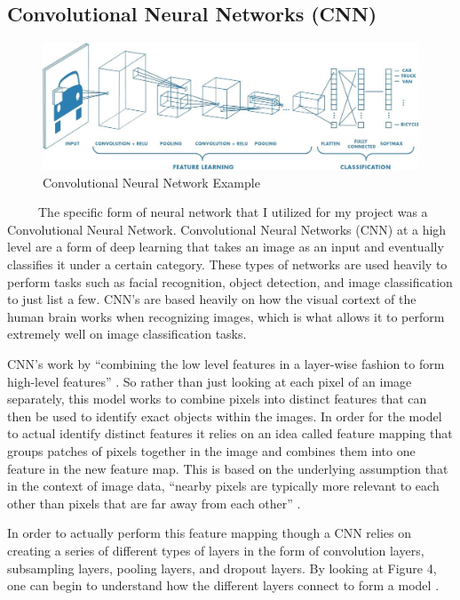 \documentclass[12pt]{article}
\begin{document}
\hypertarget{convolutional-neural-networks-cnn}{%
\subsection{Convolutional Neural Networks
(CNN)}\label{convolutional-neural-networks-cnn}}

\begin{figure}

{\centering \includegraphics[width=0.75\linewidth,height=0.25\textheight]{images/cnn} 

}

\caption{Convolutional Neural Network Example}\label{fig:sample-fig4}
\end{figure}

~~~~~The specific form of neural network that I utilized for my project
was a Convolutional Neural Network. Convolutional Neural Networks (CNN)
at a high level are a form of deep learning that takes an image as an
input and eventually classifies it under a certain category. These types
of networks are used heavily to perform tasks such as facial
recognition, object detection, and image classification to just list a
few. CNN's are based heavily on how the visual cortext of the human
brain works when recognizing images, which is what allows it to perform
extremely well on image classification tasks.

CNN's work by ``combining the low level features in a layer-wise fashion
to form high-level features'' \citep{PML}. So rather than just looking
at each pixel of an image separately, this model works to combine pixels
into distinct features that can then be used to identify exact objects
within the images. In order for the model to actual identify distinct
features it relies on an idea called feature mapping that groups patches
of pixels together in the image and combines them into one feature in
the new feature map. This is based on the underlying assumption that in
the context of image data, ``nearby pixels are typically more relevant
to each other than pixels that are far away from each other''
\citep{PML}.

In order to actually perform this feature mapping though a CNN relies on
creating a series of different types of layers in the form of
convolution layers, subsampling layers, pooling layers, and dropout
layers. By looking at Figure 4, one can begin to understand how the
different layers connect to form a model \citep{CNN}.
\end{document}
